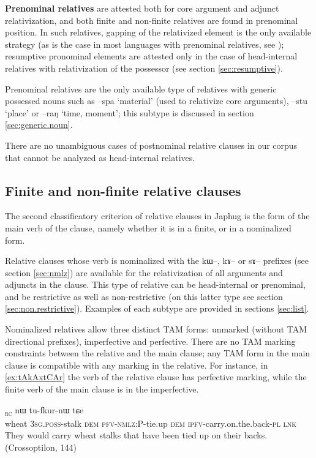 \documentclass[oldfontcommands,oneside,a4paper,11pt]{article}
\newcommand{\ipa}[1]{{\phon #1}} %
\newcommand{\topic}{\textsc{dem}}
\newcommand{\tete}{\textsuperscript{\textsc{head}}}
\newcommand{\rc}{\textsubscript{\textsc{rc}}}
\begin{document}
  
  
\textbf{Prenominal relatives}  are attested both for core argument and adjunct relativization, and both finite and non-finite relatives are found in prenominal position. In such relatives, gapping of the relativized element is the only available strategy (as is the case in most languages with prenominal relatives, see \citealt[587-8]{wu11prenominal}); resumptive pronominal elements are  attested only in the case of head-internal relatives with relativization of the possessor (see section \ref{sec:resumptive}).

  
Prenominal relatives are the only available type of relatives with generic possessed nouns such as \ipa{--spa} `material' (used to relativize core arguments), \ipa{--stu} `place' or \ipa{--raŋ} `time, moment'; this subtype is discussed in section \ref{sec:generic.noun}.

There are no unambiguous cases of postnominal relative clauses in our corpus that cannot be analyzed as head-internal relatives.

\subsection{Finite and non-finite relative clauses} \label{sec:nmlz.vs.n.nmlz}

The second classificatory criterion of relative clauses in Japhug is the form of the main verb of the clause, namely whether it is in a finite, or in a nominalized form.


Relative clauses whose verb is nominalized with the \ipa{kɯ}--, \ipa{kɤ}-- or \ipa{sɤ}-- prefixes (see section \ref{sec:nmlz}) are available for the relativization of all arguments and adjuncts in the clause. This type of relative can be head-internal or prenominal, and be restrictive as well as non-restrictive (on this latter type see section \ref{sec:non.restrictive}). Examples of each subtype are provided in sections \ref{sec:list}.

Nominalized relatives allow three distinct TAM forms: unmarked (without TAM directional prefixes), imperfective and perfective. There are no  TAM marking constraints between the relative and the main clause; any TAM form in the main clause is compatible with any marking in the relative. For instance, in \ref{ex:tAkAxtCAr} the verb of the relative clause has perfective marking, while the finite verb of the main clause is in the imperfective. 

 
\begin{exe}
\ex \label{ex:tAkAxtCAr}
\gll
	[\textbf{\ipa{qɤj}}  	\textbf{\ipa{ɯ-ru}}\tete{}  	\ipa{nɯnɯ}  	\ipa{tɤ-kɤ-xtɕɤr}]\rc{}  	\ipa{nɯ}  	\ipa{tu-fkur-nɯ}  	\ipa{tɕe}  \\
wheat	\textsc{3sg.poss}-stalk \topic{} \textsc{pfv-nmlz:P}-tie.up \topic{} \textsc{ipfv}-carry.on.the.back-\textsc{pl} \textsc{lnk} \\
	\glt They would carry  wheat stalks that have been tied up on their backs.	(Crossoptilon, 144)
	  \end{exe} 
\end{document}
